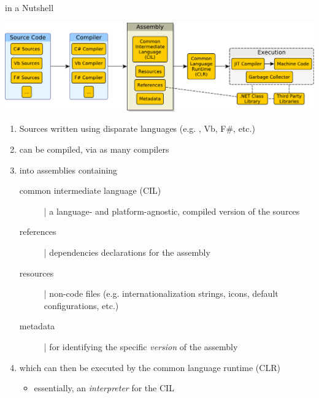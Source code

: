 \documentclass[presentation]{beamer}
\begin{document}
\begin{frame}[allowframebreaks]{\dotnet in a Nutshell}
    \begin{center}
        \includegraphics[width=\linewidth]{img/dotnet-overview.pdf}
    \end{center}

    \framebreak

    \begin{enumerate}
        \item Sources written using disparate \alert{languages} (e.g. \csharp, Vb, F\#, etc.)
        
        \smallskip

        \item can be compiled, via as many \alert{compilers}
        
        \smallskip

        \item into \alert{assemblies} containing
        \begin{description}
            \item[common intermediate language (CIL)] |  a language- and platform-agnostic, compiled version of the sources
            \item[references] | dependencies declarations for the assembly
            \item[resources] | non-code files (e.g. internationalization strings, icons, default configurations, etc.) 
            \item[metadata] | for identifying the specific \emph{version} of the assembly
        \end{description}

        \smallskip
        
        \item which can then be executed by the \alert{common language runtime} (CLR) 
        \begin{itemize}
            \item essentially, an \emph{interpreter} for the CIL
        \end{itemize}


\end{enumerate}
\end{frame}
\end{document}
